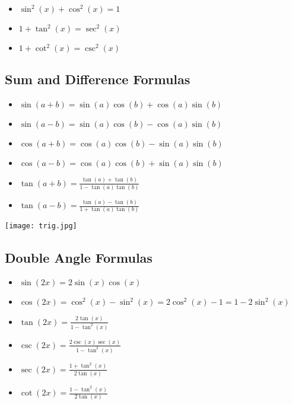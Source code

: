 \begin{itemize}

    \item \( \sin^2(x) + \cos^2(x) = 1 \)

    \item \( 1 + \tan^2(x) = \sec^2(x) \)

    \item \( 1 + \cot^2(x) = \csc^2(x) \)

\end{itemize}

\subsection{Sum and Difference Formulas}

\begin{itemize}

    \item \( \sin(a + b) = \sin(a)\cos(b) + \cos(a)\sin(b) \)

    \item \( \sin(a - b) = \sin(a)\cos(b) - \cos(a)\sin(b) \)

    \item \( \cos(a + b) = \cos(a)\cos(b) - \sin(a)\sin(b) \)

    \item \( \cos(a - b) = \cos(a)\cos(b) + \sin(a)\sin(b) \)

    \item \( \tan(a + b) = \frac{\tan(a) + \tan(b)}{1 - \tan(a)\tan(b)}\)

    \item \( \tan(a - b) = \frac{\tan(a) - \tan(b)}{1 + \tan(a)\tan(b)}\)
    
\end{itemize}

\begin{center}
\texttt{[image: trig.jpg]}
\end{center}

\subsection{Double Angle Formulas}

\begin{itemize}

    \item \( \sin(2x) = 2\sin(x)\cos(x) \)

    \item \( \cos(2x) = \cos^2(x) - \sin^2(x) = 2\cos^2(x) - 1 = 1 - 2\sin^2(x) \)

    \item \( \tan(2x) = \frac{2\tan(x)}{1 - \tan^2(x)}\)

    \item \( \csc(2x) = \frac{2\csc(x)\sec(x)}{1 - \tan^2(x)}\)

    \item \( \sec(2x) = \frac{1 + \tan^2(x)}{2\tan(x)}\)

    \item \( \cot(2x) = \frac{1 - \tan^2(x)}{2\tan(x)}\)

\end{itemize}

